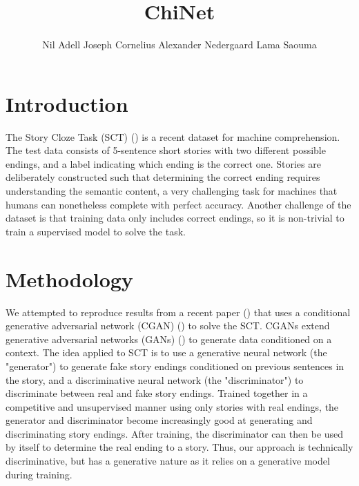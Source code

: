\documentclass{article}
\title{ChiNet}
\author{Nil Adell \qquad Joseph Cornelius \qquad Alexander Nedergaard \qquad Lama Saouma}
\begin{document}

\maketitle


\section{Introduction}
The Story Cloze Task (SCT) (\cite{2016arXiv160401696M}) is a recent dataset for machine comprehension. The test data consists of 5-sentence short stories with two different possible endings, and a label indicating which ending is the correct one. Stories are deliberately constructed such that determining the correct ending requires understanding the semantic content, a very challenging task for machines that humans can nonetheless complete with perfect accuracy. Another challenge of the dataset is that training data only includes correct endings, so it is non-trivial to train a supervised model to solve the task.
\section{Methodology}
We attempted to reproduce results from a recent paper (\cite{ijcai2017-576}) that uses a conditional generative adversarial network (CGAN) (\cite{2014arXiv1411.1784M}) to solve the SCT. CGANs extend generative adversarial networks (GANs) (\cite{2014arXiv1406.2661G}) to generate data conditioned on a context. The idea applied to SCT is to use a generative neural network (the "generator") to generate fake story endings conditioned on previous sentences in the story, and a discriminative neural network (the "discriminator") to discriminate between real and fake story endings. Trained together in a competitive and unsupervised manner using only stories with real endings, the generator and discriminator become increasingly good at generating and discriminating story endings. After training, the discriminator can then be used by itself to determine the real ending to a story. Thus, our approach is technically discriminative, but has a generative nature as it relies on a generative model during training.
\end{document}
